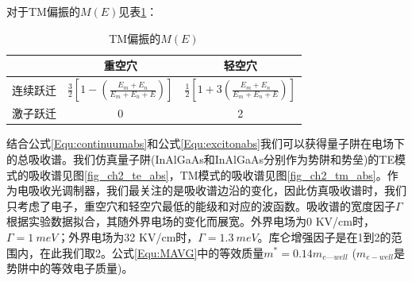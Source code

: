 对于TM偏振的$M(E)$见表\ref{METM}：
{
	\begin{table}[htb]
		\caption{TM偏振的$M(E)$}
		\label{METM}
		\centering
		\begin{tabular}[t]{p{3cm}cc}
			\hline
			& 重空穴 & 轻空穴 \\
			\hline
			连续跃迁  & $\frac{3}{2} \left[ 1- \left( \frac{E_m + E_n}{E_m+E_n+E}\right)\right]$ & $\frac{1}{2} \left[ 1+3 \left( \frac{E_m + E_n}{E_m+E_n+E}\right)\right]$ \\
			激子跃迁  & 0 & 2\\
			\hline
		\end{tabular}
	\end{table}
}

结合公式\ref{Equ:continuumabs}和公式\ref{Equ:excitonabs}我们可以获得量子阱在电场下的总吸收谱。我们仿真量子阱(InAlGaAs和InAlGaAs分别作为势阱和势垒)的TE模式的吸收谱见图\ref{fig_ch2_te_abs}，TM模式的吸收谱见图\ref{fig_ch2_tm_abs}。作为电吸收光调制器，我们最关注的是吸收谱边沿的变化，因此仿真吸收谱时，我们只考虑了电子，重空穴和轻空穴最低的能级和对应的波函数。吸收谱的宽度因子$\Gamma$根据实验数据拟合，其随外界电场的变化而展宽。外界电场为0 KV/cm时，$ \Gamma = 1 ~meV$；外界电场为32 KV/cm时，$ \Gamma = 1.3 ~meV$。库仑增强因子是在1到2的范围内\cite{mares1993modeling, chuang1995physics}，在此我们取2。公式\ref{Equ:MAVG}中的等效质量$m^* = 0.14m_{e—well}$ ($m_{e-well}$是势阱中的等效电子质量)。

